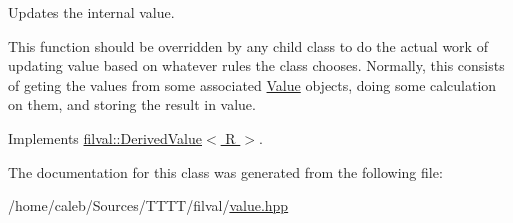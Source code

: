 Updates the internal value. 

This function should be overridden by any child class to do the actual work of updating value based on whatever rules the class chooses. Normally, this consists of geting the values from some associated \hyperlink{classfilval_1_1Value}{Value} objects, doing some calculation on them, and storing the result in value. 

Implements \hyperlink{classfilval_1_1DerivedValue_a74e04450a550454510329a9e6b941304}{filval\+::\+Derived\+Value$<$ R $>$}.



The documentation for this class was generated from the following file\+:\begin{DoxyCompactItemize}
\item 
/home/caleb/\+Sources/\+T\+T\+T\+T/filval/\hyperlink{value_8hpp}{value.\+hpp}\end{DoxyCompactItemize}
